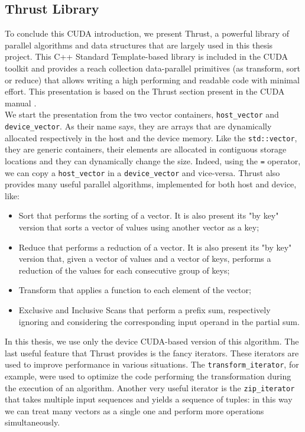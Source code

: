 \subsection{Thrust Library}
To conclude this CUDA introduction, we present Thrust, a powerful library of parallel algorithms and data structures that are largely used in this thesis project. This C++ Standard Template-based library is included in the CUDA toolkit and provides a reach collection data-parallel primitives (as transform, sort or reduce) that allows writing a high performing and readable code with minimal effort. This presentation is based on the Thrust section present in the CUDA manual \cite{cuda_manual}.\\
We start the presentation from the two vector containers, \verb|host_vector| and \verb|device_vector|. As their name says, they are arrays that are dynamically allocated respectively in the host and the device memory. Like the \verb|std::vector|, they are generic containers, their elements are allocated in contiguous storage locations and they can dynamically change the size. Indeed, using the \verb|=| operator, we can copy a \verb|host_vector| in a \verb|device_vector| and vice-versa. 
Thrust also provides many useful parallel algorithms, implemented for both host and device, like:
\begin{itemize}
	\item Sort that performs the sorting of a vector. It is also present its "by key" version that sorts a vector of values using another vector as a key;
	\item Reduce that performs a reduction of a vector. It is also present its "by key" version that, given a vector of values and a vector of keys, performs a reduction of the values for each consecutive group of keys;
	\item Transform that applies a function to each element of the vector;
	\item Exclusive and Inclusive Scans that perform a prefix sum, respectively ignoring and considering the corresponding input operand in the partial sum.
\end{itemize}
In this thesis, we use only the device CUDA-based version of this algorithm.
The last useful feature that Thrust provides is the fancy iterators. These iterators are used to improve performance in various situations. The \verb|transform_iterator|, for example, were used to optimize the code performing the transformation during the execution of an algorithm. Another very useful iterator is the \verb|zip_iterator| that takes multiple input sequences and yields a sequence of tuples: in this way we can treat many vectors as a single one and perform more operations simultaneously.